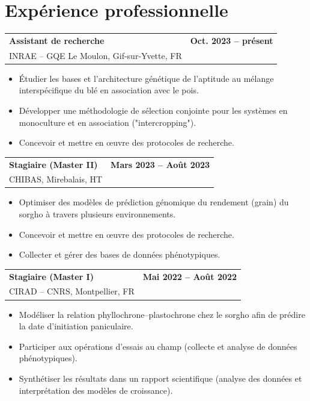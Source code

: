 \documentclass[10pt,a4paper]{article}
\makeatletter
\newcommand{\sizeTitre}{\fontsize{11}{13.2}\selectfont}  %
\newcommand{\sizeDate} {\fontsize{10}{13.2}\selectfont}  %
\newcommand{\sizeOrg}  {\fontsize{10}{12}\selectfont}    %
\newcommand{\sizeLieu} {\fontsize{10}{12}\selectfont}    %
\newcommand{\cventry}[5][2pt]{%
  \par\noindent\begin{tabularx}{\textwidth}{@{}Xr@{}}
    {\sizeTitre\textbf{#2}} & {\sizeDate\textbf{#5}}\\
    {\sizeOrg #3}   & {\sizeLieu #4}\\
  \end{tabularx}\par\vspace{#1}}
\makeatother
\begin{document}
\section{Expérience professionnelle}
\cventry[-2pt]{Assistant de recherche}{INRAE -- GQE Le Moulon, Gif-sur-Yvette, FR}{}{Oct. 2023 -- présent}
\begin{itemize}[label=\textbullet]
  \item Étudier les bases et l'architecture génétique de l'aptitude au mélange interspécifique du blé en association avec le pois.
  \item Développer une méthodologie de sélection conjointe pour les systèmes en monoculture et en association ("intercropping").
  \item Concevoir et mettre en œuvre des protocoles de recherche.
\end{itemize}
\bigskip
\cventry[-2pt]{Stagiaire (Master II)}{CHIBAS, Mirebalais, HT}{}{Mars 2023 -- Août 2023}
\begin{itemize}[label=\textbullet]
  \item Optimiser des modèles de prédiction génomique du rendement (grain) du sorgho à travers plusieurs environnements.
  \item Concevoir et mettre en œuvre des protocoles de recherche.
  \item Collecter et gérer des bases de données phénotypiques.
\end{itemize}
\bigskip
\cventry[-2pt]{Stagiaire (Master I)}{CIRAD -- CNRS, Montpellier, FR}{}{Mai 2022 -- Août 2022}
\begin{itemize}[label=\textbullet]
  \item Modéliser la relation phyllochrone--plastochrone chez le sorgho afin de prédire la date d'initiation paniculaire.
  \item Participer aux opérations d'essais au champ (collecte et analyse de données phénotypiques).
  \item Synthétiser les résultats dans un rapport scientifique (analyse des données et interprétation des modèles de croissance).
\end{itemize}

\end{document}
